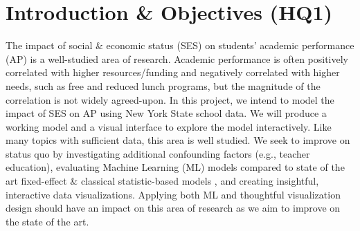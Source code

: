 \documentclass[sigconf,nonacm,11pt]{acmart}
\begin{document}



\maketitle



\section{Introduction \& Objectives (HQ1)}

The impact of  social \& economic status (SES) on students' academic performance (AP) is a well-studied area of research.  Academic performance is often positively correlated with higher resources/funding \cite{jinnai}and negatively correlated with higher needs, such as free and reduced lunch programs, but the magnitude of the correlation is not widely agreed-upon\cite{sirin}. In this project, we intend to model the impact of SES on AP using New York State school data. We will produce a working model and a visual interface to explore the model interactively. Like many topics with sufficient data, this area is well studied. We seek to improve on status quo by investigating additional confounding factors (e.g., teacher education), evaluating Machine Learning (ML) models compared to state of the art fixed-effect \& classical statistic-based models \cite{hearn}, and creating insightful, interactive data visualizations. Applying both ML and thoughtful visualization design should have an impact on this area of research as we aim to improve on the state of the art.
\end{document}
